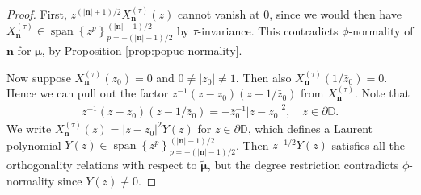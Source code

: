 \documentclass[reqno,centertags,11pt,draft]{amsart}
\newcommand{\D}{\mathbb{D}}
\renewcommand{\d}{\partial}
\newcommand{\abs}[1]{\left|#1\right|}
\newcommand{\set}[1]{\left\{#1\right\}}
\begin{document}
\begin{proof}
    First, $z^{(\abs{\bm{n}}+1)/2}X_{\bm{n}}^{(\tau)}(z)$ cannot vanish at $0$, since we would then have $X_{\bm{n}}^{(\tau)} \in \operatorname{span}\set{z^p}_{p = -(\abs{\bm{n}}-1)/2}^{(\abs{\bm{n}}-1)/2}$ by $\tau$-invariance. This contradicts $\phi$-normality of $\bm{n}$ for $\bm{\mu}$, by Proposition \ref{prop:popuc normality}.
    
    Now suppose $X_{\bm{n}}^{(\tau)}(z_0) = 0$ and $0 \neq \abs{z_0} \neq 1$. Then also $X_{\bm{n}}^{(\tau)}(1/\bar{z}_0) = 0$. Hence we can pull out the factor $z^{-1}(z-z_0)(z-1/\bar{z}_0)$ from $X_{\bm{n}}^{(\tau)}$. Note that 
\begin{align}\label{eq:factorization 1}
    z^{-1}(z-z_0)(z-1/\bar{z}_0) = -\bar{z}_0^{-1}\abs{z-z_{0}}^2, \quad z \in \d\D.
\end{align}
We write $X_{\bm{n}}^{(\tau)}(z) = \abs{z-z_{0}}^2Y(z)$ for $z \in \d\D$, which defines a Laurent polynomial $Y(z) \in \operatorname{span}\set{z^p}_{p = -(\abs{\bm{n}}-1)/2}^{(\abs{\bm{n}}-1)/2}$. Then $z^{-1/2}Y(z)$ satisfies all the orthogonality relations with respect to $\widetilde{\bm{\mu}}$, but the degree restriction contradicts $\phi$-normality since $Y(z) \not\equiv 0$.

\end{proof}
\end{document}
